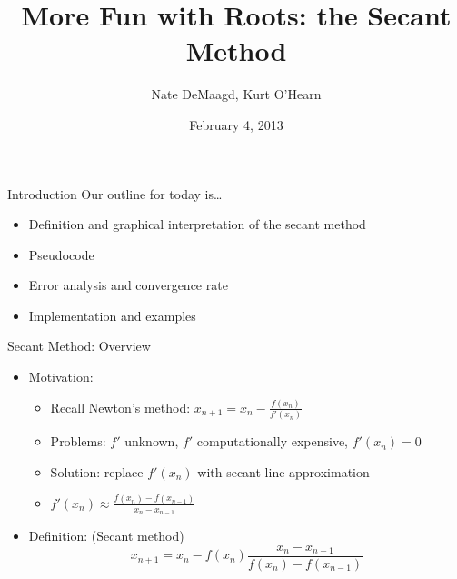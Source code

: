 \documentclass[9pt, serif]{beamer}
\title[Secant method]
{More Fun with Roots: the Secant Method}
\author[]
{Nate DeMaagd, Kurt O'Hearn}
\institute[Grand Valley State University]
{MTH 499-02}
\date{February 4, 2013}
\newcommand{\bi}{\begin{itemize}}
\newcommand{\ei}{\end{itemize}}
\begin{document}
\begin{frame}
  \titlepage
\end{frame}



\begin{frame}{\hspace{50mm}Introduction}
    \LARGE{Our outline for today is\ldots }
    \pause
    \bi
        \item Definition and graphical interpretation of the secant method
        \pause
        \item Pseudocode
        \pause
        \item Error analysis and convergence rate
        \pause
        \item Implementation and examples
    \ei
\end{frame}

\begin{frame}{\hspace{50mm}Secant Method: Overview}
    \bi
        \item Motivation:
        \pause
        \bi
            \item Recall Newton's method: $x_{n+1} = x_n - \frac{f(x_n)}{f'(x_n)}$
            \pause
            \item Problems: $f'$ unknown, $f'$ computationally expensive, $f'(x_n) = 0$
            \pause
            \item Solution: replace $f'(x_n)$ with secant line approximation
            \pause
            \item $f'(x_n) \approx \frac{f(x_n) - f(x_{n-1})}{x_n - x_{n-1}}$
        \ei
        \pause
        \item Definition: (Secant method) \\
        \pause
        $$x_{n+1} = x_n - f(x_n)\frac{x_n - x_{n-1}}{f(x_n) - f(x_{n-1})}$$
    \ei
\end{frame}
\end{document}
